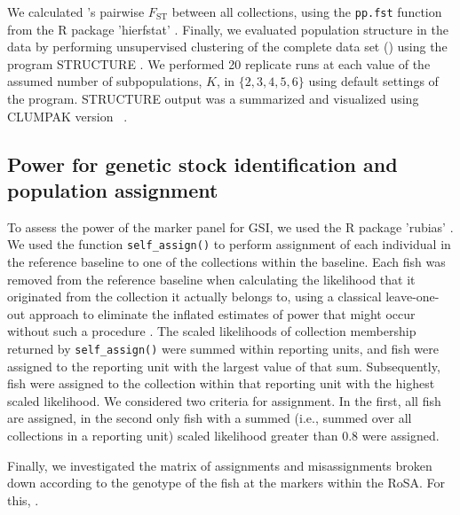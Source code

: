We calculated \citet{weir1984estimating}'s pairwise $F_\mathrm{ST}$ between
all collections, using the {\footnotesize\tt pp.fst} function from the R
package 'hierfstat' \citep{hierfstat}. Finally, we evaluated population
structure in the data by performing unsupervised clustering of
the complete data set () 
using the program STRUCTURE \citep{pritchard2000inference,falush2003inference}.
We performed 20 replicate runs at each value of the assumed number of
subpopulations, $K$, in $\{2, 3, 4, 5, 6\}$ 
using default settings of the program.  STRUCTURE output was
a summarized and visualized using CLUMPAK version~
\citep{kopelman2015clumpak}.






\subsection*{Power for genetic stock identification and population assignment}

To assess the power of the marker panel for GSI, we used the R package
'rubias' \citep{moran2019bayesian}.  We used the function {\tt self\_assign()}
to perform assignment of each individual in the reference baseline to one of the
collections within the baseline.  Each fish was removed from the reference baseline
when calculating the likelihood that it originated from the collection it actually belongs
to, using a classical leave-one-out approach to eliminate the inflated estimates of
power that might occur without such a procedure \citep{anderson2008improved}.
The scaled likelihoods of collection membership returned by
{\tt self\_assign()} were summed within reporting units, and fish were
assigned to the reporting unit with the largest value of that sum.  Subsequently,
fish were assigned to the collection within that reporting unit with the highest
scaled likelihood.  We considered two criteria for assignment.  In the first,
all fish are assigned, in the second only fish with a summed (i.e., summed
over all collections in a reporting unit)
scaled likelihood greater than 0.8 were assigned.

Finally, we investigated the matrix of assignments and misassignments
broken down according to the genotype of the fish at the markers within
the RoSA.  For this, . 


